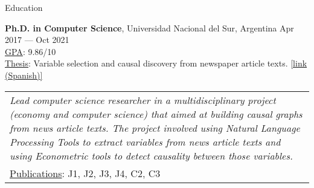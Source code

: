 \documentclass{resume} %
\begin{document}
\begin{rSection}{Education}
\smallskip
\item {\bf \large Ph.D. in Computer Science}, Universidad Nacional del Sur, Argentina \hfill {Apr 2017 --- Oct 2021}\\
\underline{GPA}: 9.86/10\\
\underline{Thesis}: Variable selection and causal discovery from  newspaper article texts. \href{https://repositoriodigital.uns.edu.ar/bitstream/handle/123456789/5827/MAISONNAVE\%20M._TESIS.pdf?sequence=2&isAllowed=y}{[link (Spanish)]}\\
\begin{table}[!ht]
\vspace{-0.7cm}
    \begin{tabular}{|p{\textwidth}}
\textit{Lead computer science researcher in a multidisciplinary project (economy and computer science) that aimed at building causal graphs from news article texts. The project involved using Natural Language Processing Tools to extract variables from news article texts and using Econometric tools to detect causality between those variables.}
\\ \underline{Publications}: J1, J2, J3, J4, C2, C3
    \end{tabular}\vspace{-0.7cm}
\end{table}





\bigskip


\end{rSection}
\end{document}
